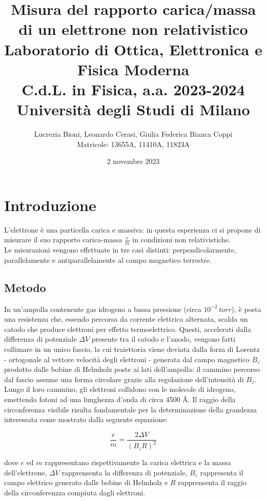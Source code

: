 \documentclass[]{article}
\title{%
    \Huge Misura del rapporto carica/massa di un elettrone non relativistico \\
    \Large Laboratorio di Ottica, Elettronica e Fisica Moderna \\ C.d.L. in Fisica, a.a. 2023-2024 \\ Università degli Studi di Milano}
\author{\LARGE Lucrezia Bioni, Leonardo Cerasi, Giulia Federica Bianca Coppi \\ Matricole: 13655A, 11410A, 11823A}
\date{2 novembre 2023}
\let\oldsection\section%
\renewcommand{\section}{%
	\renewcommand{\theequation}{\thesection.\arabic{equation}}%
	\oldsection}%
\let\oldsubsection\subsection%
\renewcommand{\subsection}{%
	\renewcommand{\theequation}{\thesubsection.\arabic{equation}}%
	\oldsubsection}%
\begin{document}
    \maketitle

    \section{Introduzione}

    L'elettrone è una particella carica e massiva: in questa esperienza ci si propone di misurare il suo rapporto carica-massa $ \frac{e}{m} $ in condizioni non relativistiche. \\
    Le misurazioni vengono effettuate in tre casi distinti: perpendicolarmente, parallelamente e antiparallelamente al campo magnetico terrestre.


    \subsection{Metodo}
    In un'ampolla contenente gas idrogeno a bassa pressione (circa $ 10^{-2}\, torr $), è posta una resistenza che, essendo percorsa da corrente elettrica alternata, scalda un catodo che produce elettroni per effetto termoelettrico. Questi, accelerati dalla differenza di potenziale $\Delta V$ presente tra il catodo e l'anodo, vengono fatti collimare in un unico fascio, la cui traiettoria viene deviata dalla forza di Lorentz - ortogonale al vettore velocità degli elettroni - generata dal campo magnetico $ B_z $ prodotto dalle bobine di Helmholz poste ai lati dell'ampolla: il cammino percorso dal fascio assume una forma circolare grazie alla regolazione dell'intensità di $B_z$. \\

    Lungo il loro cammino, gli elettroni collidono con le molecole di idrogeno, emettendo fotoni ad una lunghezza d'onda di circa 4500 Å.
    Il raggio della circonferenza visibile risulta fondamentale per la determinazione della grandezza interessata come mostrato dalla seguente equazione:

    \begin{equation}
        \label{e_m}
        \frac{e}{m} = \frac{2 \Delta V}{(B_z R)^2}
    \end{equation}

    dove $ e $ ed $ m $ rappresentano rispettivamente la carica elettrica e la massa dell'elettrone, $\Delta V$ rapprensenta la differenza di potenziale, $B_z$ rappresenta il campo elettrico generato dalle bobine di Helmholz e $ R $ rapprensenta il raggio della circonferenzza compiuta dagli elettroni. \\
\end{document}
